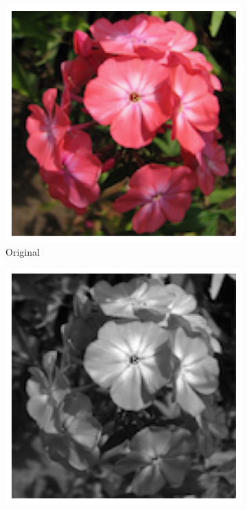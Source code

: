 \documentclass{article}
\begin{document}
\begin{figure}
	\centering
	\begin{subfigure}[b]{0.24\textwidth}
		\includegraphics[width= \textwidth]{path0}
		\caption{Original}
		\label{fg:path0}
	\end{subfigure}
	\begin{subfigure}[b]{0.24\textwidth}
		\includegraphics[width= \textwidth]{imgGrau}

\end{subfigure}
\end{figure}
\end{document}
